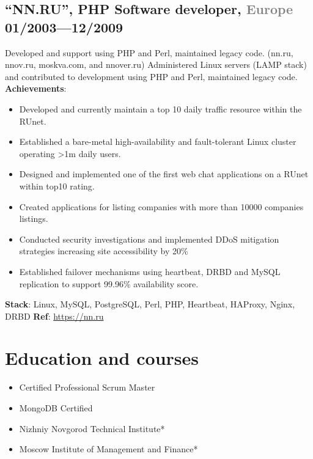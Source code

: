 \documentclass[9pt]{extarticle}
\newcommand{\datedsubsection}[2]{%
  \subsection[#1]{\small\bfseries #1 \hfill\small #2}%
}
\begin{document}
\datedsubsection{``NN.RU'', \textbf{PHP Software developer}, \textcolor{gray}{Europe}}{01/2003---12/2009}
Developed and support using PHP and Perl, maintained legacy code. (nn.ru, nnov.ru, moskva.com, and nnover.ru)
Administered Linux servers (LAMP stack) and contributed to development using PHP and Perl, maintained legacy code.\\
\textbf{Achievements}:
\begin{itemize}
  \item{ Developed and currently maintain a top 10 daily traffic resource within the RUnet. }
  \item{ Established a bare-metal high-availability and fault-tolerant Linux cluster operating >1m daily users. }
  \item{ Designed and implemented one of the first web chat applications on a RUnet within top10 rating. }
  \item{ Created applications for listing companies with more than 10000 companies listings. }
  \item{ Conducted security investigations and implemented DDoS mitigation strategies increasing site accessibility by 20\% }
  \item{ Established failover mechanisms using heartbeat, DRBD and MySQL replication to support 99.96\% availability score. }
\end{itemize}

\textbf{Stack}: Linux, MySQL, PostgreSQL, Perl, PHP, Heartbeat, HAProxy, Nginx, DRBD
\textbf{Ref}: \href{https://nn.ru}{https://nn.ru}

\section{Education and courses}
\begin{itemize}
  \item{Certified Professional Scrum Master}
  \item{MongoDB Certified}
  \item{Nizhniy Novgorod Technical Institute}*
  \item{Moscow Institute of Management and Finance}*
\end{itemize}
\end{document}

